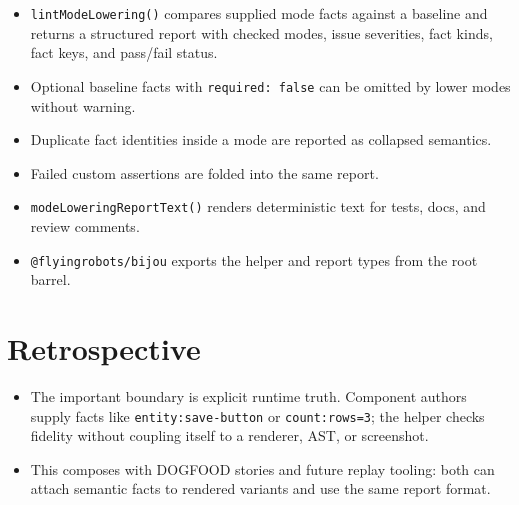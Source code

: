 \begin{itemize}
\tightlist
\item
  \texttt{l\allowbreak{}i\allowbreak{}n\allowbreak{}t\allowbreak{}M\allowbreak{}o\allowbreak{}d\allowbreak{}e\allowbreak{}L\allowbreak{}o\allowbreak{}w\allowbreak{}e\allowbreak{}r\allowbreak{}i\allowbreak{}n\allowbreak{}g\allowbreak{}(\allowbreak{})} compares supplied mode facts against a baseline and returns a structured report with checked modes, issue severities, fact kinds, fact keys, and pass/fail status.
\item
  Optional baseline facts with \texttt{r\allowbreak{}e\allowbreak{}q\allowbreak{}u\allowbreak{}i\allowbreak{}r\allowbreak{}e\allowbreak{}d\allowbreak{}:\allowbreak{} \allowbreak{}f\allowbreak{}a\allowbreak{}l\allowbreak{}s\allowbreak{}e} can be omitted by lower modes without warning.
\item
  Duplicate fact identities inside a mode are reported as collapsed semantics.
\item
  Failed custom assertions are folded into the same report.
\item
  \texttt{m\allowbreak{}o\allowbreak{}d\allowbreak{}e\allowbreak{}L\allowbreak{}o\allowbreak{}w\allowbreak{}e\allowbreak{}r\allowbreak{}i\allowbreak{}n\allowbreak{}g\allowbreak{}R\allowbreak{}e\allowbreak{}p\allowbreak{}o\allowbreak{}r\allowbreak{}t\allowbreak{}T\allowbreak{}e\allowbreak{}x\allowbreak{}t\allowbreak{}(\allowbreak{})} renders deterministic text for tests, docs, and review comments.
\item
  \texttt{@\allowbreak{}f\allowbreak{}l\allowbreak{}y\allowbreak{}i\allowbreak{}n\allowbreak{}g\allowbreak{}r\allowbreak{}o\allowbreak{}b\allowbreak{}o\allowbreak{}t\allowbreak{}s\allowbreak{}/\allowbreak{}b\allowbreak{}i\allowbreak{}j\allowbreak{}o\allowbreak{}u} exports the helper and report types from the root barrel.
\end{itemize}

\section{Retrospective}\label{record-126-retrospective}

\begin{itemize}
\tightlist
\item
  The important boundary is explicit runtime truth. Component authors supply facts like \texttt{e\allowbreak{}n\allowbreak{}t\allowbreak{}i\allowbreak{}t\allowbreak{}y\allowbreak{}:\allowbreak{}s\allowbreak{}a\allowbreak{}v\allowbreak{}e\allowbreak{}-\allowbreak{}b\allowbreak{}u\allowbreak{}t\allowbreak{}t\allowbreak{}o\allowbreak{}n} or \texttt{c\allowbreak{}o\allowbreak{}u\allowbreak{}n\allowbreak{}t\allowbreak{}:\allowbreak{}r\allowbreak{}o\allowbreak{}w\allowbreak{}s\allowbreak{}=\allowbreak{}3}; the helper checks fidelity without coupling itself to a renderer, AST, or screenshot.
\item
  This composes with DOGFOOD stories and future replay tooling: both can attach semantic facts to rendered variants and use the same report format.
\end{itemize}

